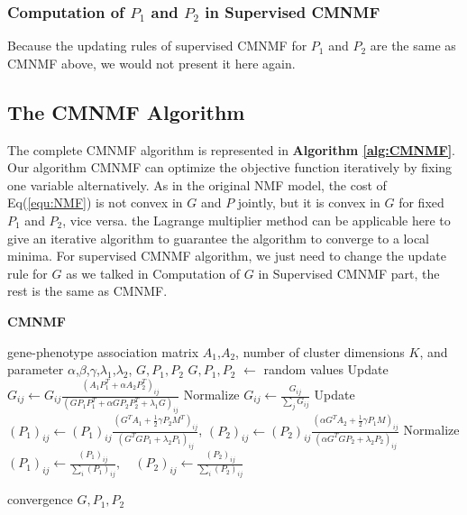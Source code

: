 \documentclass{bmcart}
\begin{document}
\subsubsection*{\textbf{Computation of $P_1$ and $P_2$ in Supervised CMNMF}}
Because the updating rules of supervised CMNMF for $P_1$ and $P_2$ are the same as CMNMF above, we would not present it here again.

\subsection*{\textbf{The CMNMF Algorithm}}
The complete CMNMF algorithm is represented in \textbf{Algorithm \ref{alg:CMNMF}}. Our algorithm CMNMF can optimize the objective function iteratively by fixing one variable alternatively. As in the original NMF model, the cost of Eq(\ref{equ:NMF}) is not convex in $G$ and $P$ jointly, but it is convex in $G$ for fixed $P_1$ and $P_2$, vice versa. the Lagrange multiplier method can be applicable here to give an iterative algorithm to guarantee the algorithm to converge to a local minima\cite{Zunyan2014}. For supervised CMNMF algorithm, we just need to change the update rule for $G$ as we talked in \textup{Computation of $G$ in Supervised CMNMF} part, the rest is the same as CMNMF.
\begin{algorithm}[t]
\caption{\textbf{CMNMF}}\label{alg:CMNMF}
\renewcommand{\algorithmicrequire}{\textbf{Input:}}
\renewcommand{\algorithmicensure}{\textbf{Output:}}
\label{alg:pf}
\begin{algorithmic}[1]
\REQUIRE gene-phenotype association matrix $A_1$,$A_2$, number of cluster dimensions $K$, and parameter $\alpha$,$\beta$,$\gamma$,$\lambda_1$,$\lambda_2$,
\ENSURE {} ${G}, {P_1},{P_2}$
\STATE ${G},{P_1},{P_2}$ $\leftarrow$ random values
\REPEAT
    \STATE Update $G_{ij}\leftarrow G_{ij}\frac{(A_1P_1^T+\alpha A_2P_2^T)_{ij}}{(GP_1P_1^T+\alpha GP_2P_2^T+\lambda_1G)_{ij}}$
    \STATE Normalize $G_{ij}\leftarrow \frac{G_{ij}}{\sum_{j}G_{ij}}$
    \STATE Update $(P_1)_{ij}\leftarrow (P_1)_{ij}\frac{(G^TA_1+\frac{1}{2}\gamma P_2M^T)_{ij}}{(G^TGP_1+\lambda_2P_1)_{ij}}$,
    $(P_2)_{ij}\leftarrow (P_2)_{ij}\frac{(\alpha G^TA_2+\frac{1}{2}\gamma P_1M)_{ij}}
{(\alpha G^TGP_2 + \lambda_2P_2)_{ij}}$
    \STATE Normalize $(P_1)_{ij}\leftarrow \frac{(P_1)_{ij}}{\sum_{i}(P_1)_{ij}}, \quad
(P_2)_{ij}\leftarrow \frac{(P_2)_{ij}}{\sum_{i}(P_2)_{ij}}$

\UNTIL convergence
\RETURN ${G},{P_1},{P_2}$
\end{algorithmic}
\end{algorithm}
\end{document}
